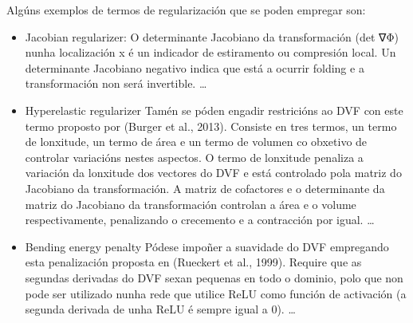 Algúns exemplos de termos de regularización que se poden empregar son:
\begin{itemize}
    \item Jacobian regularizer: 
    O determinante Jacobiano da transformación (det ∇Φ) nunha localización x é un indicador de estiramento ou compresión local.
    Un determinante Jacobiano negativo indica que está a ocurrir folding e a transformación non será invertible.
    \dots

    \item Hyperelastic regularizer
    Tamén se póden engadir restricións ao DVF con este termo proposto por (Burger et al., 2013).
    Consiste en tres termos, un termo de lonxitude, un termo de área e un termo de volumen co obxetivo de controlar variacións nestes aspectos.
    O termo de lonxitude penaliza a variación da lonxitude dos vectores do DVF e está controlado pola matriz do Jacobiano da transformación.
    A matriz de cofactores e o determinante da matriz do Jacobiano da transformación controlan a área e o volume respectivamente, 
    penalizando o crecemento e a contracción por igual.
    \dots

    \item Bending energy penalty
    Pódese impoñer a suavidade do DVF empregando esta penalización proposta en (Rueckert et al., 1999).
    Require que as segundas derivadas do DVF sexan pequenas en todo o dominio, 
    polo que non pode ser utilizado nunha rede que utilice ReLU como función de activación (a segunda derivada de unha ReLU é sempre igual a 0).
    \dots
\end{itemize}